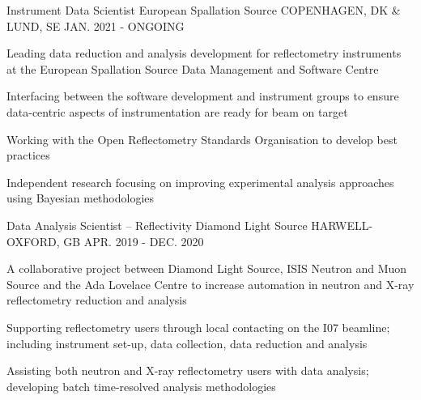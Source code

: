 \begin{cventries}
  \cventry
    {Instrument Data Scientist}
    {European Spallation Source}
    {COPENHAGEN, DK \& LUND, SE}
    {JAN. 2021 - ONGOING}
    {
      \begin{cvitems}
        \item {Leading data reduction and analysis development for reflectometry instruments at the European Spallation Source Data Management and Software Centre}
        \item {Interfacing between the software development and instrument groups to ensure data-centric aspects of instrumentation are ready for beam on target}
        \item {Working with the Open Reflectometry Standards Organisation to develop best practices}
        \item {Independent research focusing on improving experimental analysis approaches using Bayesian methodologies}
      \end{cvitems}
    }
  \cventry
    {Data Analysis Scientist -- Reflectivity}
    {Diamond Light Source}
    {HARWELL-OXFORD, GB}
    {APR. 2019 - DEC. 2020}
    {
      \begin{cvitems}
        \item {A collaborative project between Diamond Light Source, ISIS Neutron and Muon Source and the Ada Lovelace Centre to increase automation in neutron and X-ray reflectometry reduction and analysis}
        \item {Supporting reflectometry users through local contacting on the I07 beamline; including instrument set-up, data collection, data reduction and analysis}
        \item {Assisting both neutron and X-ray reflectometry users with data analysis; developing batch time-resolved analysis methodologies}
      \end{cvitems}
    }
\end{cventries}
